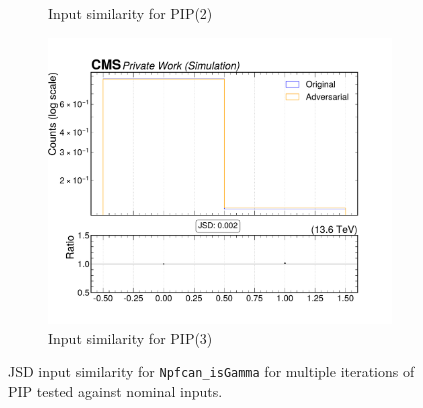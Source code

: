 \begin{figure}[htbp]
\begin{subfigure}[t]{0.32\textwidth}
    \caption{Input similarity for PIP(2)}
  \end{subfigure}\hfill
  \begin{subfigure}[t]{0.32\textwidth}
    \includegraphics[width=\linewidth]{media/output/features/compare/intprob_3/cmp_npf_arr_Npfcan_isGamma.pdf}
    \caption{Input similarity for PIP(3)}
  \end{subfigure}

  \caption{JSD input similarity for \texttt{Npfcan\_isGamma} for multiple iterations of PIP tested against nominal inputs.}
  \label{fig:intprob_input_Npfcan_isGamma}
\end{figure}